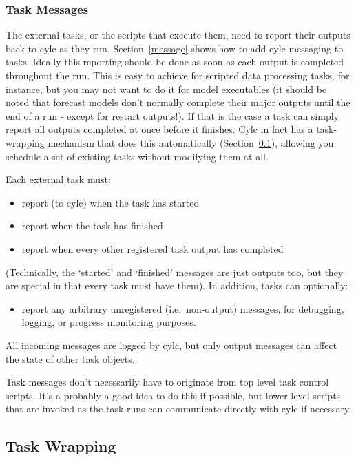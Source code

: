 \documentclass[11pt,a4paper]{article}
\begin{document}
\subsubsection{Task Messages}

The external tasks, or the scripts that execute them, need to report
their outputs back to cylc as they run. Section~\ref{message} shows
how to add cylc messaging to tasks.  Ideally this reporting should be
done as soon as each output is completed throughout the run. This is
easy to achieve for scripted data processing tasks, for instance, but
you may not want to do it for model executables (it should be noted that
forecast models don't normally complete their major outputs until the
end of a run - except for restart outputs!). If that is the case a task
can simply report all outputs completed at once before it finishes.
Cylc in fact has a task-wrapping mechanism that does this automatically
(Section~\ref{TaskWrapping}), allowing you schedule a set of existing
tasks without modifying them at all.  

Each external task must:

\begin{itemize}
\item report (to cylc) when the task has started
\item report when the task has finished
\item report when every other registered task output has
completed
\end{itemize}

(Technically, the `started' and `finished' messages are just
outputs too, but they are special in that every task
must have them). In addition, tasks can optionally:

\begin{itemize}
\item report any arbitrary unregistered (i.e.\ non-output)
messages, for debugging, logging, or progress monitoring purposes.
\end{itemize}

All incoming messages are logged by cylc, but only output messages can
affect the state of other task objects.

Task messages don't necessarily have to originate from top level task
control scripts. It's a probably a good idea to do this if possible, but
lower level scripts that are invoked as the task runs can communicate
directly with cylc if necessary.

\subsection{Task Wrapping}
\label{TaskWrapping}
\end{document}
